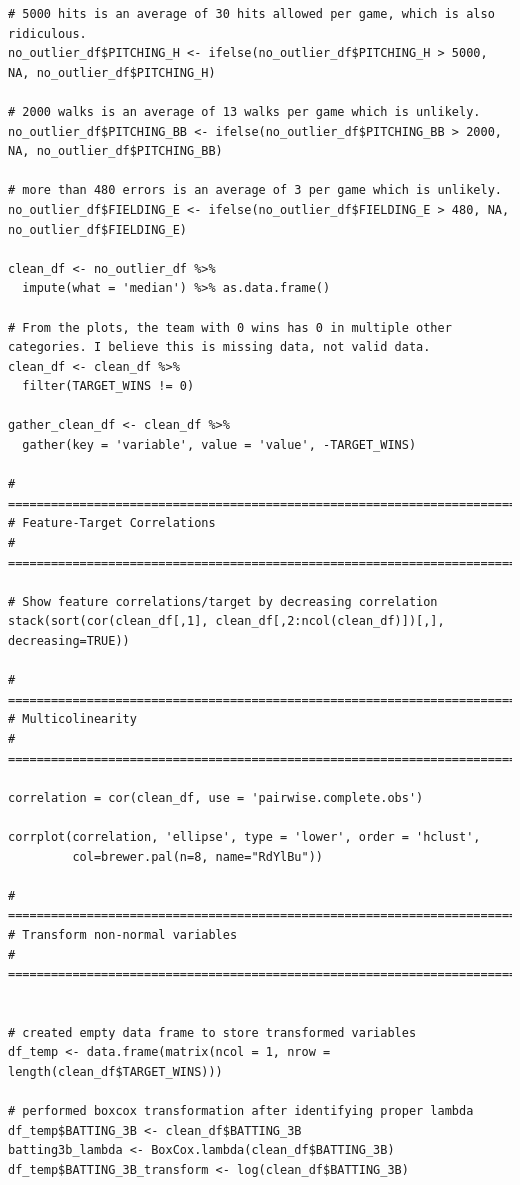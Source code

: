 \documentclass[
]{article}
\begin{document}
\begin{verbatim}
# 5000 hits is an average of 30 hits allowed per game, which is also ridiculous.
no_outlier_df$PITCHING_H <- ifelse(no_outlier_df$PITCHING_H > 5000, NA, no_outlier_df$PITCHING_H)

# 2000 walks is an average of 13 walks per game which is unlikely.
no_outlier_df$PITCHING_BB <- ifelse(no_outlier_df$PITCHING_BB > 2000, NA, no_outlier_df$PITCHING_BB)

# more than 480 errors is an average of 3 per game which is unlikely.
no_outlier_df$FIELDING_E <- ifelse(no_outlier_df$FIELDING_E > 480, NA, no_outlier_df$FIELDING_E)

clean_df <- no_outlier_df %>% 
  impute(what = 'median') %>% as.data.frame()

# From the plots, the team with 0 wins has 0 in multiple other categories. I believe this is missing data, not valid data.
clean_df <- clean_df %>% 
  filter(TARGET_WINS != 0)

gather_clean_df <- clean_df %>% 
  gather(key = 'variable', value = 'value', -TARGET_WINS)

# =====================================================================================
# Feature-Target Correlations 
# =====================================================================================

# Show feature correlations/target by decreasing correlation
stack(sort(cor(clean_df[,1], clean_df[,2:ncol(clean_df)])[,], decreasing=TRUE))

# =====================================================================================
# Multicolinearity 
# =====================================================================================

correlation = cor(clean_df, use = 'pairwise.complete.obs')

corrplot(correlation, 'ellipse', type = 'lower', order = 'hclust',
         col=brewer.pal(n=8, name="RdYlBu"))

# =====================================================================================
# Transform non-normal variables 
# =====================================================================================
         

# created empty data frame to store transformed variables
df_temp <- data.frame(matrix(ncol = 1, nrow = length(clean_df$TARGET_WINS)))

# performed boxcox transformation after identifying proper lambda
df_temp$BATTING_3B <- clean_df$BATTING_3B
batting3b_lambda <- BoxCox.lambda(clean_df$BATTING_3B)
df_temp$BATTING_3B_transform <- log(clean_df$BATTING_3B)


\end{verbatim}
\end{document}
